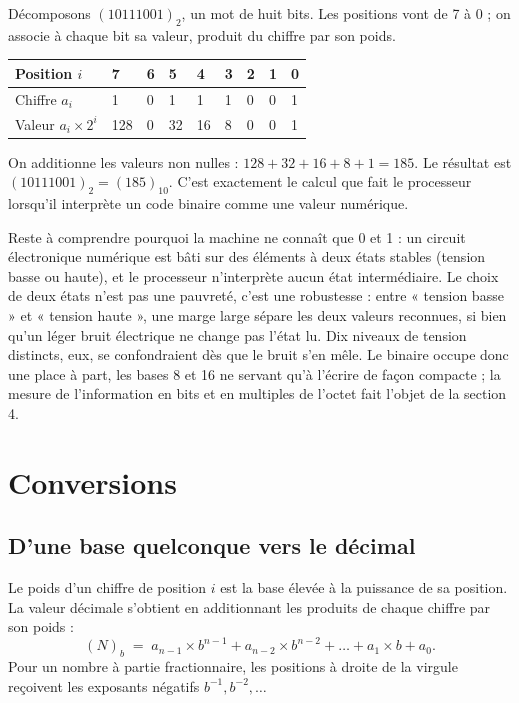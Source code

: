\begin{exemple}
Décomposons $(10111001)_2$, un mot de huit bits. Les positions vont de 7 à 0 ; on associe à chaque bit sa valeur, produit du chiffre par son poids.

\begin{center}
\small
\begin{tabular}{L{2.5cm}*{8}{C{0.85cm}}}
\toprule
{}Position $i$ & 7 & 6 & 5 & 4 & 3 & 2 & 1 & 0\\
\midrule
Chiffre $a_i$ & 1 & 0 & 1 & 1 & 1 & 0 & 0 & 1\\
Valeur $a_i\times 2^{i}$ & 128 & 0 & 32 & 16 & 8 & 0 & 0 & 1\\
\bottomrule
\end{tabular}
\label{ch3:tab:poids}
\end{center}

On additionne les valeurs non nulles : $128 + 32 + 16 + 8 + 1 = 185$. Le résultat est $(10111001)_2 = (185)_{10}$. C'est exactement le calcul que fait le processeur lorsqu'il interprète un code binaire comme une valeur numérique.
\end{exemple}

Reste à comprendre pourquoi la machine ne connaît que 0 et 1 : un circuit électronique numérique est bâti sur des éléments à deux états stables (tension basse ou haute), et le processeur n'interprète aucun état intermédiaire. Le choix de deux états n'est pas une pauvreté, c'est une robustesse : entre « tension basse » et « tension haute », une marge large sépare les deux valeurs reconnues, si bien qu'un léger bruit électrique ne change pas l'état lu. Dix niveaux de tension distincts, eux, se confondraient dès que le bruit s'en mêle. Le binaire occupe donc une place à part, les bases 8 et 16 ne servant qu'à l'écrire de façon compacte ; la mesure de l'information en bits et en multiples de l'octet fait l'objet de la section 4.

\section{Conversions}

\subsection{D'une base quelconque vers le décimal}

\begin{methode}
Le poids d'un chiffre de position $i$ est la base élevée à la puissance de sa position. La valeur décimale s'obtient en additionnant les produits de chaque chiffre par son poids :
\[
(N)_b \;=\; a_{n-1}\times b^{n-1} + a_{n-2}\times b^{n-2} + \dots + a_1\times b + a_0 .
\]
Pour un nombre à partie fractionnaire, les positions à droite de la virgule reçoivent les exposants négatifs $b^{-1}, b^{-2}, \dots$
\end{methode}

